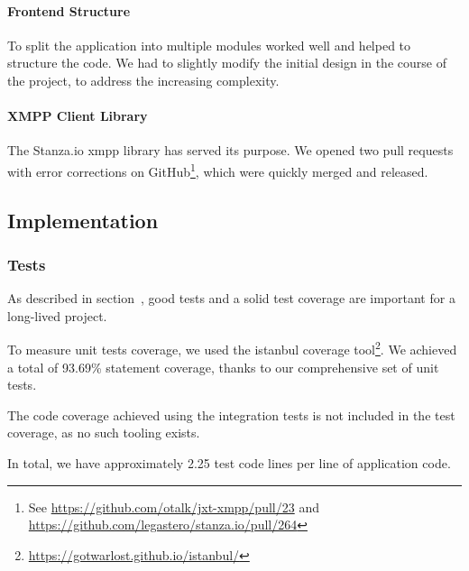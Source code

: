 \paragraph{Frontend Structure}
To split the application into multiple modules worked well and helped to structure the code.
We had to slightly modify the initial design in the course of the project, to address the increasing complexity.

\paragraph{XMPP Client Library}
The Stanza.io \gls{xmpp} library has served its purpose.
We opened two pull requests with error corrections on GitHub\footnote{See \url{https://github.com/otalk/jxt-xmpp/pull/23} and \url{https://github.com/legastero/stanza.io/pull/264}}, which were quickly merged and released.

\subsection{Implementation}

\subsubsection{Tests}
As described in section~, good tests and a solid test coverage are important for a long-lived project.

To measure unit tests coverage, we used the istanbul coverage tool\footnote{\url{https://gotwarlost.github.io/istanbul/}}. We achieved a total of 93.69\% statement coverage, thanks to our comprehensive set of unit tests.

The code coverage achieved using the integration tests is not included in the test coverage, as no such tooling exists.

In total, we have approximately 2.25 test code lines per line of application code.

